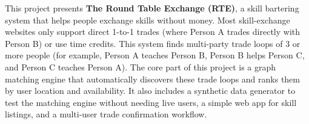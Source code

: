 This project presents \textbf{The Round Table Exchange (RTE)}, a skill bartering system that helps people exchange skills without money. Most skill-exchange websites only support direct 1-to-1 trades (where Person A trades directly with Person B) or use time credits. This system finds multi-party trade loops of 3 or more people (for example, Person A teaches Person B, Person B helps Person C, and Person C teaches Person A). The core part of this project is a graph matching engine that automatically discovers these trade loops and ranks them by user location and availability. It also includes a synthetic data generator to test the matching engine without needing live users, a simple web app for skill listings, and a multi-user trade confirmation workflow.